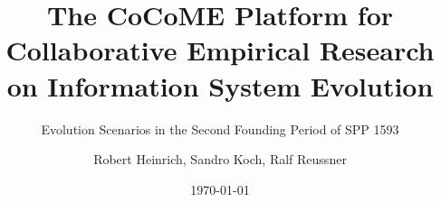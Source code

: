 \documentclass[12pt,headsepline,twoside,draft]{scrreprt}
\begin{document}
	\setpdf
	
	\setcounter{secnumdepth}{3}
	
	\title{The CoCoME Platform for \linebreak Collaborative Empirical Research on Information System Evolution} 
	\subtitle{Evolution Scenarios in the Second Founding Period of SPP 1593}
	
	\author{Robert Heinrich, Sandro Koch, Ralf Reussner}
	
	\date{\today}
	
	
	
	\maketitle
	\clearpage
	
	\tableofcontents
	\clearpage
	
	\listoffigures
	\clearpage
	
	
	
	
	
	
	
	
	
	
	
	
	
	
	
	
	\nocite{*}
	
	
	
	\sloppy
\end{document}
